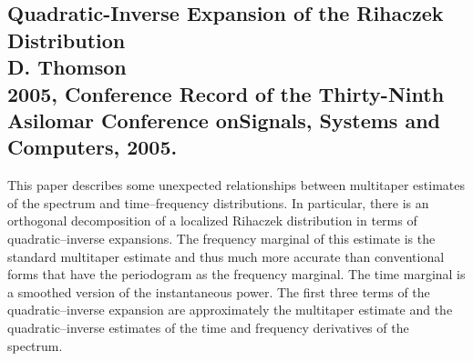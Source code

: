 \documentclass{article}
\begin{document}
\subsection{Quadratic-Inverse Expansion of the Rihaczek Distribution \\
D. Thomson \\
2005, Conference Record of the Thirty-Ninth Asilomar Conference onSignals, Systems and Computers, 2005.}
This paper describes some unexpected relationships between multitaper estimates of the spectrum and time–frequency distributions. In particular, there is an orthogonal decomposition of a localized Rihaczek distribution in terms of quadratic–inverse expansions. The frequency marginal of this estimate is the standard multitaper estimate and thus much more accurate than conventional forms that have the periodogram as the frequency marginal. The time marginal is a smoothed version of the instantaneous power. The first three terms of the quadratic–inverse expansion are approximately the multitaper estimate and the quadratic–inverse estimates of the time and frequency derivatives of the spectrum.\\

\end{document}
